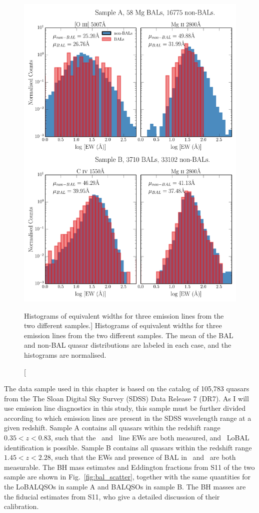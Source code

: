 \begin{figure} %
\centering
\includegraphics[width=1.0\textwidth]{figures/ewpaper/ew_hist_qsos.png}
\caption
[Histograms of equivalent widths for three emission lines from the two different samples.]
{
Histograms of equivalent widths for three emission lines from the two different samples.
The mean of the BAL and non-BAL quasar distributions are labeled in each case, and
the histograms are normalised.
}
\label{fig:ew_hists}
\end{figure} %

The data sample used in this chapter is based on the
\citet[][hereafter S11]{shen2011} catalog of
105,783 quasars from the The Sloan Digital Sky Survey (SDSS) 
Data Release 7 (DR7). 
As I will use emission line diagnostics in this study,
this sample must be further divided according to which 
emission lines are present in 
the SDSS wavelength range at a given redshift. 
Sample A contains all quasars within the redshift range $0.35<z<0.83$, 
such that the \mgline\ and \oiiifull\ line EWs are both measured, 
and \mg\ LoBAL identification
is possible.  Sample B contains all quasars within the redshift 
range $1.45<z<2.28$, such that 
the EWs and presence of BAL in \mgline\ and \civline\ are both measurable.
The BH mass estimates and Eddington fractions from S11 of the two sample
are shown in Fig.~\ref{fig:bal_scatter}, together with the same quantities 
for the LoBALQSOs in sample A and BALQSOs in sample B. The BH masses
are the fiducial estimates from S11, who give a detailed discussion of 
their calibration.

